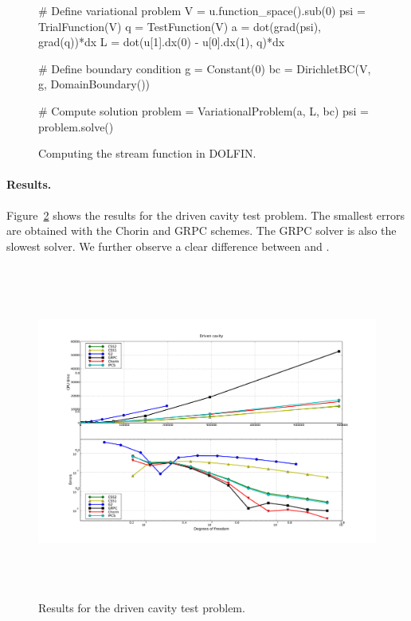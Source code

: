 \begin{figure}
  \begin{center}
    \begin{python}
# Define variational problem
V   = u.function_space().sub(0)
psi = TrialFunction(V)
q   = TestFunction(V)
a   = dot(grad(psi), grad(q))*dx
L   = dot(u[1].dx(0) - u[0].dx(1), q)*dx

# Define boundary condition
g  = Constant(0)
bc = DirichletBC(V, g, DomainBoundary())

# Compute solution
problem = VariationalProblem(a, L, bc)
psi = problem.solve()
    \end{python}
    \caption{Computing the stream function in DOLFIN.}
    \label{fig:streamfunction}
  \end{center}
\end{figure}

\paragraph{Results.}

Figure~\ref{fig:drivencavity_CPU_and_errors} shows the results for the
driven cavity test problem.  The smallest errors are obtained with the
Chorin and GRPC schemes. The GRPC solver is also the slowest
solver. We further observe a clear difference between  and
.

\begin{figure}
  \hspace{-2cm}
  \center\includegraphics[width=20cm,height=11cm,keepaspectratio=false]{chapters/kvs-1/pdf/new_drivencavity_res.pdf}
  \caption{Results for the driven cavity test problem.}
  \label{fig:drivencavity_CPU_and_errors}
\end{figure}

